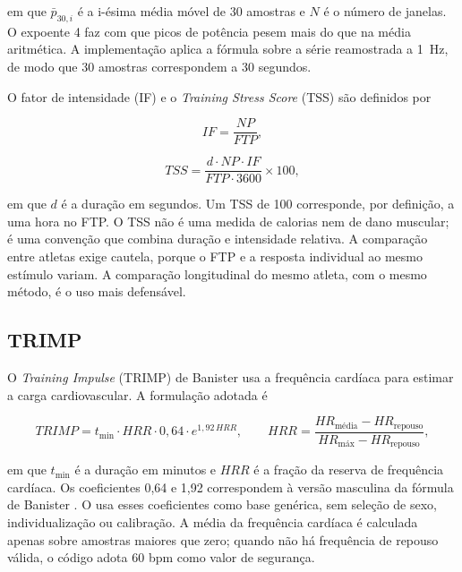 \noindent em que $\bar{p}_{30,i}$ é a i-ésima média móvel de 30 amostras e $N$
é o número de janelas. O expoente 4 faz com que picos de potência pesem mais
do que na média aritmética. A implementação aplica a fórmula sobre a série
reamostrada a \SI{1}{\hertz}, de modo que 30 amostras correspondem a 30
segundos.

O fator de intensidade (IF) e o \textit{Training Stress Score} (TSS) são
definidos por

\begin{equation}\label{eq:if}
IF = \frac{NP}{FTP},
\end{equation}

\begin{equation}\label{eq:tss}
TSS = \frac{d \cdot NP \cdot IF}{FTP \cdot 3600} \times 100,
\end{equation}

\noindent em que $d$ é a duração em segundos. Um TSS de 100 corresponde,
por definição, a uma hora no FTP. O TSS não é uma medida de calorias nem de
dano muscular; é uma convenção que combina duração e intensidade relativa. A
comparação entre atletas exige cautela, porque o FTP e a resposta individual ao
mesmo estímulo variam. A comparação longitudinal do mesmo atleta, com o mesmo
método, é o uso mais defensável.

\subsection{TRIMP}
\label{sec:trimp}

O \textit{Training Impulse} (TRIMP) de Banister usa a frequência cardíaca para
estimar a carga cardiovascular. A formulação adotada é

\begin{equation}\label{eq:trimp}
TRIMP = t_{\min} \cdot HRR \cdot 0{,}64 \cdot e^{1{,}92\,HRR},
\qquad
HRR = \frac{HR_{\text{média}} - HR_{\text{repouso}}}
{HR_{\text{máx}} - HR_{\text{repouso}}},
\end{equation}

\noindent em que $t_{\min}$ é a duração em minutos e $HRR$ é a fração da
reserva de frequência cardíaca. Os coeficientes 0,64 e 1,92 correspondem à
versão masculina da fórmula de Banister \cite{banister1991,morton1990}. O
\argus{} usa esses coeficientes como base genérica, sem seleção de sexo,
individualização ou calibração. A média da frequência cardíaca é calculada
apenas sobre amostras maiores que zero; quando não há frequência de repouso
válida, o código adota 60 bpm como valor de segurança.

